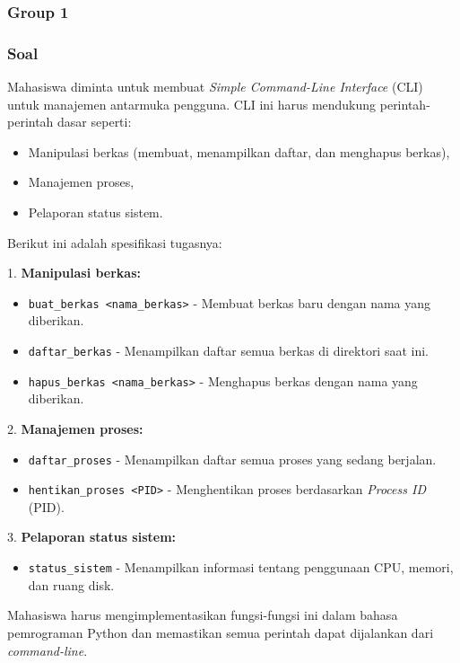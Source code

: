 \documentclass[12pt]{article}
\begin{document}
\subsubsection{Group 1}
\subsubsection*{Soal}
Mahasiswa diminta untuk membuat \textit{Simple Command-Line Interface} (CLI) untuk manajemen antarmuka pengguna. CLI ini harus mendukung perintah-perintah dasar seperti:

\begin{itemize}
    \item Manipulasi berkas (membuat, menampilkan daftar, dan menghapus berkas),
    \item Manajemen proses,
    \item Pelaporan status sistem.
\end{itemize}

Berikut ini adalah spesifikasi tugasnya:

1. \textbf{Manipulasi berkas:}
    \begin{itemize}
        \item \texttt{buat\_berkas <nama\_berkas>} - Membuat berkas baru dengan nama yang diberikan.
        \item \texttt{daftar\_berkas} - Menampilkan daftar semua berkas di direktori saat ini.
        \item \texttt{hapus\_berkas <nama\_berkas>} - Menghapus berkas dengan nama yang diberikan.
    \end{itemize}

2.  \textbf{Manajemen proses:}
    \begin{itemize}
        \item \texttt{daftar\_proses} - Menampilkan daftar semua proses yang sedang berjalan.
        \item \texttt{hentikan\_proses <PID>} - Menghentikan proses berdasarkan \textit{Process ID} (PID).
    \end{itemize}

3.  \textbf{Pelaporan status sistem:}
    \begin{itemize}
        \item \texttt{status\_sistem} - Menampilkan informasi tentang penggunaan CPU, memori, dan ruang disk.
    \end{itemize}

Mahasiswa harus mengimplementasikan fungsi-fungsi ini dalam bahasa pemrograman Python dan memastikan semua perintah dapat dijalankan dari \textit{command-line}.
\end{document}
